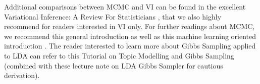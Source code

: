 Additional comparisons between MCMC and VI can be found in the excellent Variational Inference: A Review For Statisticians \cite{BleiVariational2017}, that we also highly recommend for readers interested in VI only. For further readings about MCMC, we recommend this general introduction \cite{BrooksHBMonteCarlo2011} as well as this machine learning oriented introduction \cite{Andrieu2003}. The reader interested to learn more about Gibbs Sampling applied to LDA can refer to this Tutorial \cite{Darling2011ATA} on Topic Modelling and Gibbs Sampling (combined with these lecture note \cite{Mukherjee2014} on LDA Gibbs Sampler for cautious derivation).

